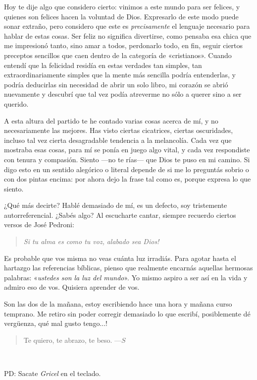 \documentclass[a4paper]{article}
\begin{document}
Hoy te dije algo que considero cierto: vinimos a este mundo para ser felices, y
quienes son felices hacen la voluntad de Dios. Expresarlo de este modo puede
sonar extraño, pero considero que este es \textit{precisamente} el lenguaje
necesario para hablar de estas cosas. Ser feliz no significa divertirse, como
pensaba esa chica que me impresionó tanto, sino amar a todos, perdonarlo todo,
en fin, seguir ciertos preceptos sencillos que caen dentro de la categoría de
«cristianos». Cuando entendí que la felicidad residía en estas verdades tan
simples, tan extraordinariamente simples que la mente más sencilla podría
entenderlas, y podría deducirlas sin necesidad de abrir un solo libro, mi
corazón se abrió nuevamente y descubrí que tal vez podía atreverme no sólo a
querer sino a ser querido. 

A esta altura del partido te he contado varias cosas acerca de mí, y no
necesariamente las mejores. Has visto ciertas cicatrices, ciertas oscuridades,
incluso tal vez cierta desagradable tendencia a la melancolía. Cada vez que
mostraba esas cosas, para mí se ponía en juego algo vital, y cada vez
respondiste con tenura y compasión. Siento ---no te rías--- que Dios te puso en
mi camino. Si digo esto en un sentido alegórico o literal depende de si me lo
preguntás sobrio o con dos pintas encima: por ahora dejo la frase tal como es,
porque expresa lo que siento.

¿Qué más decirte? Hablé demasiado de mí, es un defecto, soy tristemente
autorreferencial. ¿Sabés algo? Al escucharte cantar, siempre recuerdo ciertos
versos de José Pedroni:

\begin{quote}
    \textit{Si tu alma es como tu voz,}\newline
    \textit{alabado sea Dios!}
\end{quote}

Es probable que vos misma no veas cuánta luz irradiás. Para agotar hasta el
hartazgo las referencias bíblicas, pienso que realmente encarnás aquellas
hermosas palabras: «\textit{ustedes son la luz del mundo}». Yo mismo aspiro a
ser así en la vida y admiro eso de vos. Quisiera aprender de vos.

Son las dos de la mañana, estoy escribiendo hace una hora y mañana curso
temprano. Me retiro sin poder corregir demasiado lo que escribí, posiblemente dé
vergüenza, qué mal gusto tengo...! 

\begin{quote}
Te quiero, te abrazo, te beso. \newline
---$S$
\end{quote}

~ 

PD: Sacate \textit{Gricel} en el teclado.
\end{document}
